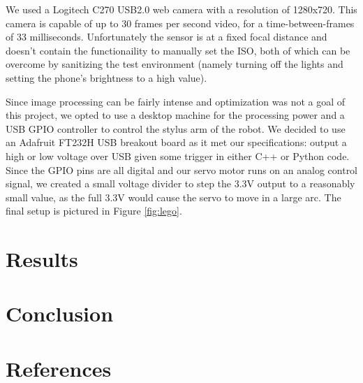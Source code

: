 \documentclass[twocolumn,a4paper,12pt]{article}
\begin{document}
We used a Logitech C270 USB2.0 web camera with a resolution of 1280x720. This
camera is capable of up to 30 frames per second video, for a time-between-frames
of 33 milliseconds. Unfortunately the sensor is at a fixed focal distance and
doesn't contain the functionaility to manually set the ISO, both of which can be
overcome by sanitizing the test environment (namely turning off the lights and
setting the phone's brightness to a high value).

Since image processing can be fairly intense and optimization was not a goal of
this project, we opted to use a desktop machine for the processing power and a
USB GPIO controller to control the stylus arm of the robot. We decided to use an
Adafruit FT232H USB breakout board as it met our specifications: output a high
or low voltage over USB given some trigger in either C++ or Python code. Since
the GPIO pins are all digital and our servo motor runs on an analog control
signal, we created a small voltage divider to step the 3.3V output to a
reasonably small value, as the full 3.3V would cause the servo to move in a
large arc. The final setup is pictured in Figure \ref{fig:lego}.


\section{Results}

\section{Conclusion}

\section{References}
\end{document}

